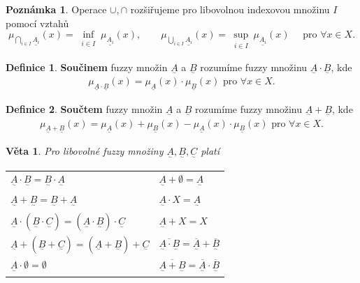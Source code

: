 \documentclass[a4]{report}
\newcommand{\fA}{\underset{^\sim}A}
\newcommand{\fB}{\underset{^\sim}B}
\newcommand{\fC}{\underset{^\sim}C}
\newcommand{\muA}{\mu_{\fA}}
\newcommand{\muB}{\mu_{\fB}}
\newtheorem{theorem}{Věta}
\theoremstyle{definition}
\newtheorem{definition}{Definice}[section]
\newtheorem{remark}{Poznámka}[section]
\begin{document}
{\begin{remark}
Operace $\cup, \cap$ rozšiřujeme pro libovolnou indexovou množinu $I$ pomocí vztahů
\begin{equation*}
\mu_{\bigcap\limits_{i \in I} \underset{^\sim}{A_i}}(x) = \inf_{\substack{i \in I}} \mu_{\underset{^\sim}{A_i}}(x), \qquad \mu_{\bigcup\limits_{i \in I} \underset{^\sim}{A_i}}(x) = \sup_{\substack{i \in I}} \mu_{\underset{^\sim}{A_i}}(x) \quad \text{ pro } \forall x \in X.
\end{equation*}
\end{remark}

\begin{definition}
\textbf{Součinem} fuzzy množin $\fA$ a $\fB$ rozumíme fuzzy množinu $\fA \cdot \fB$, kde
\begin{equation*}
\mu_{\fA \cdot \fB}(x) =  \muA(x) \cdot \muB(x) \text{ pro } \forall x \in X.
\end{equation*}
\end{definition}

\begin{definition}
\textbf{Součtem} fuzzy množin $\fA$ a $\fB$ rozumíme fuzzy množinu $\fA + \fB$, kde
\begin{equation*}
\mu_{\fA + \fB}(x) =  \muA(x) + \muB(x) - \muA(x) \cdot \muB(x) \text{ pro } \forall x \in X.
\end{equation*}
\end{definition}

\begin{theorem}
Pro libovolné fuzzy množiny $\fA, \fB, \fC$ platí
\begin{table}[H]
\centering
\begin{tabular}{ll}
$\fA \cdot \fB = \fB \cdot \fA$                         & $\fA + \emptyset = \fA$                                    \\
$\fA + \fB = \fB + \fA$                                 & $\fA \cdot X= \fA$                                           \\
$\fA \cdot (\fB \cdot \fC) = (\fA \cdot \fB) \cdot \fC$ & $\fA + X = X$                                              \\
$\fA + (\fB + \fC) = (\fA + \fB) + \fC$                 & $\overline{\fA \cdot \fB}=\overline{\fA} + \overline{\fB}$ \\
$\fA \cdot \emptyset = \emptyset$                       & $\overline{\fA + \fB}=\overline{\fA} \cdot \overline{\fB}$
\end{tabular}
\end{table}
\end{theorem}

}
\end{document}
